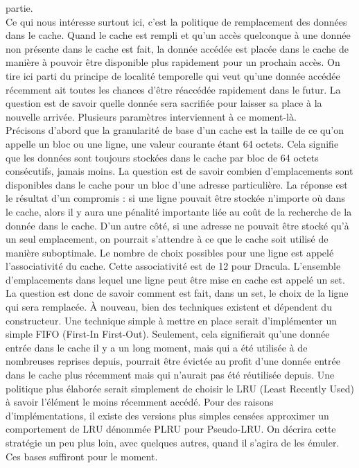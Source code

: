 \documentclass{report}
\begin{document}
partie.
\\Ce qui nous intéresse surtout ici, c'est la politique de remplacement des données dans le cache. 
Quand le cache est rempli et qu'un accès quelconque à une donnée non présente dans le cache est
fait, la donnée accédée est placée dans le cache de manière à pouvoir être disponible plus 
rapidement pour un prochain accès. On tire ici parti du principe de localité temporelle qui 
veut qu'une donnée accédée récemment ait toutes les chances d'être réaccédée rapidement dans 
le futur. La question est de savoir quelle donnée sera sacrifiée pour laisser sa place à la
nouvelle arrivée. Plusieurs paramètres interviennent à ce moment-là.
\\Précisons d'abord que la granularité de base d'un cache est la taille de ce qu'on appelle
un bloc ou une ligne, une valeur courante étant 64 octets. Cela signifie que les données
sont toujours stockées dans le cache par bloc de 64 octets consécutifs, jamais moins. La
question est de savoir combien d'emplacements sont disponibles dans le cache pour un bloc
d'une adresse particulière. La réponse est le résultat d'un compromis : si une ligne pouvait
être stockée n'importe où dans le cache, alors il y aura une pénalité importante liée au coût
de la recherche de la donnée dans le cache. D'un autre côté, si une adresse ne pouvait être
stocké qu'à un seul emplacement, on pourrait s'attendre à ce que le cache soit utilisé de 
manière suboptimale. Le nombre de choix possibles pour une ligne est appelé l'associativité
du cache. Cette associativité est de 12 pour Dracula. L'ensemble d'emplacements dans lequel
une ligne peut être mise en cache est appelé un set.
\\La question est donc de savoir comment est fait, dans un set, le choix de la ligne qui sera
remplacée. À nouveau, bien des techniques existent et dépendent du constructeur. Une technique
simple à mettre en place serait d'implémenter un simple FIFO (First-In First-Out). Seulement,
cela signifierait qu'une donnée entrée dans le cache il y a un long moment, mais qui a été utilisée 
à de nombreuses reprises depuis, pourrait être évictée au profit d'une donnée entrée dans le cache 
plus récemment mais qui n'aurait pas été réutilisée depuis. Une politique plus élaborée serait
simplement de choisir le LRU (Least Recently Used) à savoir l'élément le moins récemment accédé. 
Pour des raisons d'implémentations, il existe des versions plus simples censées approximer un 
comportement de LRU dénommée PLRU pour Pseudo-LRU. On décrira cette stratégie un peu plus loin, 
avec quelques autres, quand il s'agira de les émuler. Ces bases suffiront pour le moment.
\end{document}

